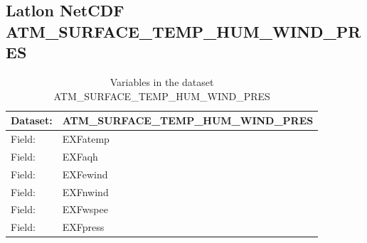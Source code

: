 \pagebreak
\subsection{Latlon NetCDF ATM\_SURFACE\_TEMP\_HUM\_WIND\_PRES}
\newp
\begin{longtable}{|p{}|p{}|}
\caption{Variables in the dataset ATM\_SURFACE\_TEMP\_HUM\_WIND\_PRES}
\label{tab:table-ATM_SURFACE_TEMP_HUM_WIND_PRES-fields} \\ 
\hline \endhead \hline \endfoot
\rowcolor{lightgray} \textbf{Dataset:} & \textbf{ATM\_SURFACE\_TEMP\_HUM\_WIND\_PRES} \\ \hline
Field: &EXFatemp \\ \hline
Field: &EXFaqh \\ \hline
Field: &EXFewind \\ \hline
Field: &EXFnwind \\ \hline
Field: &EXFwspee \\ \hline
Field: &EXFpress \\ \hline
\end{longtable}

\pagebreak
